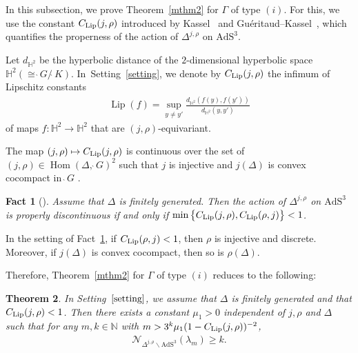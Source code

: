 \documentclass[10pt,a4paper]{amsart}
\numberwithin{equation}{section}
\newtheorem{Theorem}{Theorem}[section]
\newtheorem{Fact}[Theorem]{Fact}
 { \theoremstyle{definition}
\newtheorem{Definition}[Theorem]{Definition}
\newtheorem{Note}[Theorem]{Note}
\newtheorem{Example}[Theorem]{Example}
\newtheorem{Remark}[Theorem]{Remark}
\newtheorem{Setting}[Theorem]{Setting}
\newtheorem{Notation}[Theorem]{Notation}
}
\begin{document}
In this subsection, we prove Theorem~\ref{mthm2} for $\Gamma$ of type $(i)$.
For this, we use the constant $C_{\rm Lip}(j,\rho)$
introduced by Kassel~\cite{Ka09} and Gu\'eritaud--Kassel~\cite{GuKa17},
which quantifies the properness of the action
of $\Delta^{j,\rho}$ on $\mathrm{AdS}^{3}$.

\begin{Definition}
\label{def-lip}
Let $d_{\mathbb{H}^{2}}$ be the hyperbolic distance of
the $2$-dimensional hyperbolic space \mbox{$\mathbb{H}^{2}(\cong\grave{\ }G/\grave{\ }K)$}. In~Setting~\ref{setting},
we denote by $C_{\rm Lip}(j,\rho)$ the infimum of Lipschitz constants
\begin{gather*}
\operatorname{Lip}(f)=\sup_{y\neq y'}\frac{d_{\mathbb{H}^{2}}(f(y),f(y'))}{d_{\mathbb{H}^{2}}(y,y')}
\end{gather*}
of maps $f\colon \mathbb{H}^{2} \rightarrow \mathbb{H}^{2}$
that are $(j,\rho)$-equivariant.
\end{Definition}
The map $(j,\rho) \mapsto C_{\rm Lip}(j,\rho)$
is continuous over the set of
$(j,\rho)\in\operatorname{Hom}(\Delta,\grave{\ }G)^{2}$
such that $j$ is injective and $j(\Delta)$ is convex cocompact in $\grave{\ }G$
\cite[Proposition~1.5]{GuKa17}.
\begin{Fact}[\cite{GuKa17,Ka09}]
\label{proper}
Assume that $\Delta$ is finitely generated.
Then the action of $\Delta^{j,\rho}$ on $\mathrm{AdS}^{3}$ is pro\-perly discontinuous
if and only if $\operatorname{min}\big\{C_{\rm Lip}(j,\rho),C_{\rm Lip}(\rho,j)\big\} < 1$.
\end{Fact}

\begin{Remark}
In the setting of Fact~\ref{proper},
if $C_{\rm Lip}(\rho,j)<1$, then $\rho$ is injective and discrete.
Moreover, if $j(\Delta)$ is convex cocompact, then so is $\rho(\Delta)$.
\end{Remark}
Therefore,
Theorem~\ref{mthm2} for $\Gamma$ of type $(i)$
reduces to the following:
\begin{Theorem}
\label{non-standard}
In Setting~$\ref{setting}$, we assume that
$\Delta$ is finitely generated and that $C_{\rm Lip}(j,\rho) < 1$.
Then there exists a constant $\mu_{1}>0$ independent of $j,\rho$ and $\Delta$ such that
for any $m,k\in\mathbb{N}$ with $m > 3^{k}\mu_{1}(1-C_{\rm Lip}(j,\rho))^{-2}$,
\begin{gather*}
\mathcal{N}_{\Delta^{j,\rho}\backslash\mathrm{AdS}^{3}}(\lambda_{m}) \geq k.
\end{gather*}
\end{Theorem}
\end{document}
